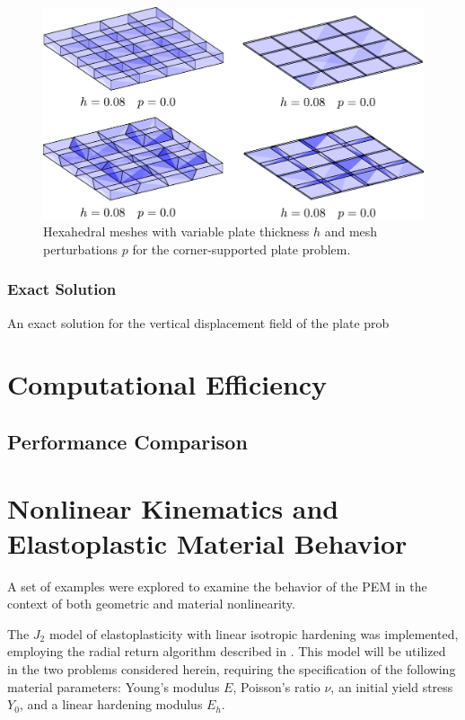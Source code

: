 \begin{figure}[!h]
  \centering
  \includegraphics[width=6.0in]{figures/plate_meshes.pdf}
  \caption{Hexahedral meshes with variable plate thickness $h$ and mesh perturbations $p$ for the corner-supported plate problem.}
  \label{fig:plate_meshes}
\end{figure}

\subsubsection{Exact Solution}

An exact solution for the vertical displacement field of the plate prob

\section{Computational Efficiency}

\subsection{Performance Comparison}



\section{Nonlinear Kinematics and Elastoplastic Material Behavior}

A set of examples were explored to examine the behavior of the PEM in the context of both geometric and material nonlinearity.

The $J_2$ model of elastoplasticity with linear isotropic hardening was implemented, employing the radial return algorithm described in \cite{LSDYNA}. This model will be utilized in the two problems considered herein, requiring the specification of the following material parameters: Young's modulus $E$, Poisson's ratio $\nu$, an initial yield stress $Y_0$, and a linear hardening modulus $E_h$.

